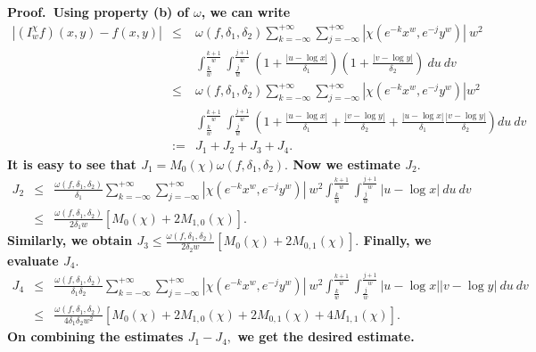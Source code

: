 \documentclass[12pt]{article}
\begin{document}
{\noindent\bf{Proof.}\rm \ Using property (b) of $\omega$, we can write
\begin{eqnarray*}
|(I_{w}^{\chi}f)(x,y) - f(x,y)| & \leq & \omega(f,\delta_{1},\delta_{2})\sum_{k= - \infty}^{+\infty} \sum_{j= - \infty}^{+\infty} |\chi(e^{-k} x^{w},e^{-j} y^{w})| \ w^{2}
\\&& \int_{\frac{k}{w}}^{\frac{k+1}{w}}\int_{\frac{j}{w}}^{\frac{j+1}{w}} \left( 1+ \frac{\left|u -  \log x \right|}{\delta_{1}} \right)\left( 1+ \frac{\left|v -  \log y \right|}{\delta_{2}} \right)\ du \ dv \\
& \leq & \omega(f,\delta_{1},\delta_{2})\sum_{k= - \infty}^{+\infty} \sum_{j= - \infty}^{+\infty} |\chi(e^{-k} x^{w},e^{-j} y^{w})| w^{2}
\\&& \int_{\frac{k}{w}}^{\frac{k+1}{w}}\int_{\frac{j}{w}}^{\frac{j+1}{w}}\left( 1+\frac{\left|u -  \log x \right|}{\delta_{1}}+\frac{\left|v -  \log y \right|}{\delta_{2}} +\frac{\left|u -  \log x \right|}{\delta_{1}}\frac{\left|v -  \log y \right|}{\delta_{2}} \right)du\ dv\\
&:=& J_{1}+J_{2}+J_{3}+J_{4}.
\end{eqnarray*}
It is easy to see that $J_{1}= M_{0}(\chi) \omega(f,\delta_{1},\delta_{2}).$ Now we estimate $J_{2}.$
\begin{eqnarray*}
J_{2} &\leq & \frac{\omega(f,\delta_{1},\delta_{2})}{\delta_{1}} \sum_{k= - \infty}^{+\infty} \sum_{j= - \infty}^{+\infty} |\chi(e^{-k} x^{w},e^{-j} y^{w})|\  w^{2} \int_{\frac{k}{w}}^{\frac{k+1}{w}}\int_{\frac{j}{w}}^{\frac{j+1}{w}}  |u-\log x| \ du\ dv \\
&\leq & \frac{\omega(f,\delta_{1},\delta_{2})}{2 \delta_{1}w} \left[ M_{0}(\chi)+ 2 M_{1,0}(\chi) \right].
\end{eqnarray*}
Similarly, we obtain $ \displaystyle J_{3} \leq \frac{\omega(f,\delta_{1},\delta_{2})}{2 \delta_{2}w} \left[ M_{0}(\chi)+ 2 M_{0,1}(\chi) \right ].$
Finally, we evaluate $J_{4}.$
\begin{eqnarray*}
J_{4} &\leq & \frac{\omega(f,\delta_{1},\delta_{2})}{\delta_{1} \delta_{2}} \sum_{k= - \infty}^{+\infty} \sum_{j= - \infty}^{+\infty} |\chi(e^{-k} x^{w},e^{-j} y^{w})| \ w^{2} \int_{\frac{k}{w}}^{\frac{k+1}{w}}\int_{\frac{j}{w}}^{\frac{j+1}{w}}  |u-\log x| |v-\log y|\ du\ dv \\
&\leq & \frac{\omega(f,\delta_{1},\delta_{2})}{4 \delta_{1} \delta_{2} w^{2}} \left[ M_{0}(\chi)+2 M_{1,0}(\chi)+2 M_{0,1}(\chi)+4 M_{1,1}(\chi) \right].
\end{eqnarray*}
On combining the estimates $J_{1}-J_{4},$ we get the desired estimate.

}
\end{document}
